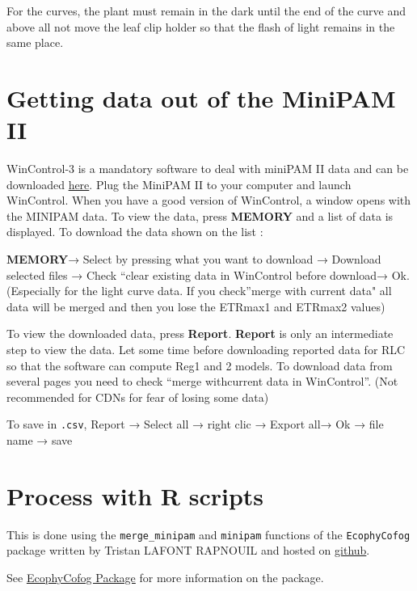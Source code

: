 \documentclass[
  12pt,
  american,
  a4paper,
  extrafontsizes,onecolumn,openright
  ]{memoir}
\begin{document}
For the curves, the plant must remain in the dark until the end of the curve and above all not move the leaf clip holder so that the flash of light remains in the same place.

\hypertarget{getting-data-out-of-the-minipam-ii}{%
\section{Getting data out of the MiniPAM II}\label{getting-data-out-of-the-minipam-ii}}

WinControl-3 is a mandatory software to deal with miniPAM II data and can be downloaded \href{https://www.walz.com/products/chl_p700/mini-pam-II/downloads.html}{here}.
Plug the MiniPAM II to your computer and launch WinControl.
When you have a good version of WinControl, a window opens with the MINIPAM data.
To view the data, press \textbf{MEMORY} and a list of data is displayed.
To download the data shown on the list :

\textbf{MEMORY}→ Select by pressing what you want to download → Download selected files → Check \enquote{clear existing data in WinControl before download→ Ok.
(Especially for the light curve data. If you check}merge with current data" all data will be merged and then you lose the ETRmax1 and ETRmax2 values)

To view the downloaded data, press \textbf{Report}.
\textbf{Report} is only an intermediate step to view the data.
Let some time before downloading reported data for RLC so that the software can compute Reg1 and 2 models.
To download data from several pages you need to check \enquote{merge withcurrent data in WinControl}.
(Not recommended for CDNs for fear of losing some data)

To save in \texttt{.csv}, Report → Select all → right clic → Export all→ Ok → file name → save

\hypertarget{process-with-r-scripts}{%
\section{Process with R scripts}\label{process-with-r-scripts}}

This is done using the \texttt{merge\_minipam} and \texttt{minipam} functions of the \texttt{EcophyCofog} package written by Tristan LAFONT RAPNOUIL and hosted on \href{https://github.com/LafontRapnouilTristan/EcophyCofog}{github}.

See \protect\hyperlink{ecophycofog-package}{EcophyCofog Package} for more information on the package.
\end{document}
